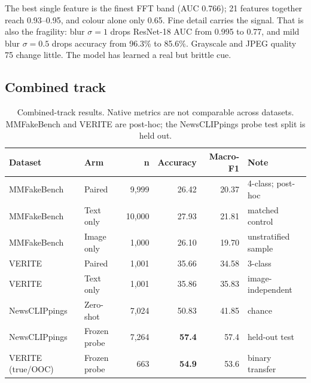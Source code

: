 \documentclass[11pt]{article}
\newcommand{\best}[1]{\textbf{#1}}
\begin{document}
The best single feature is the finest FFT band (AUC 0.766); 21 features together reach 0.93--0.95, and colour alone only 0.65. Fine detail carries the signal. That is also the fragility: blur $\sigma{=}1$ drops ResNet-18 AUC from 0.995 to 0.77, and mild blur $\sigma{=}0.5$ drops accuracy from 96.3\% to 85.6\%. Grayscale and JPEG quality 75 change little. The model has learned a real but brittle cue.

\subsection{Combined track}

\begin{table}[t]
\centering
\small
\caption{Combined-track results. Native metrics are not comparable across datasets. MMFakeBench and VERITE are post-hoc; the NewsCLIPpings probe test split is held out.}
\label{tab:combined}
\begin{tabularx}{\textwidth}{@{}l l r r r X@{}}
\toprule
\textbf{Dataset} & \textbf{Arm} & \textbf{n} & \textbf{Accuracy} & \textbf{Macro-F1} & \textbf{Note} \\
\midrule
MMFakeBench & Paired & 9{,}999 & 26.42 & 20.37 & 4-class; post-hoc \\
MMFakeBench & Text only & 10{,}000 & 27.93 & 21.81 & matched control \\
MMFakeBench & Image only & 1{,}000 & 26.10 & 19.70 & unstratified sample \\
VERITE & Paired & 1{,}001 & 35.66 & 34.58 & 3-class \\
VERITE & Text only & 1{,}001 & 35.86 & 35.83 & image-independent \\
NewsCLIPpings & Zero-shot & 7{,}024 & 50.83 & 41.85 & chance \\
NewsCLIPpings & Frozen probe & 7{,}264 & \best{57.4} & 57.4 & held-out test \\
VERITE (true/OOC) & Frozen probe & 663 & \best{54.9} & 53.6 & binary transfer \\
\bottomrule
\end{tabularx}
\end{table}
\end{document}

